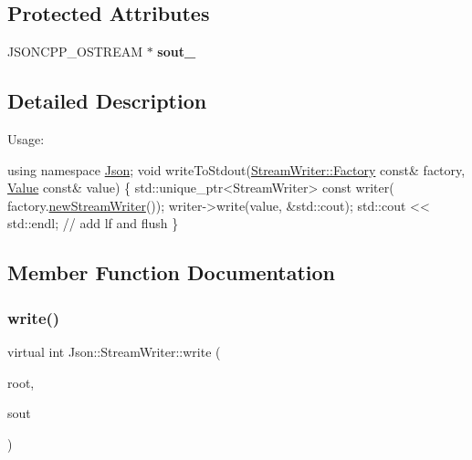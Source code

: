 \subsection*{Protected Attributes}
\begin{DoxyCompactItemize}
\item 
\mbox{\label{classJson_1_1StreamWriter_a4f5603d4228a9fa46a42cb44e5234d9b}} 
J\+S\+O\+N\+C\+P\+P\+\_\+\+O\+S\+T\+R\+E\+AM $\ast$ {\bfseries sout\+\_\+}
\end{DoxyCompactItemize}


\subsection{Detailed Description}
Usage\+: 
\begin{DoxyCode}
\textcolor{keyword}{using namespace }\hyperlink{namespaceJson}{Json};
\textcolor{keywordtype}{void} writeToStdout(\hyperlink{classJson_1_1StreamWriter_1_1Factory}{StreamWriter::Factory} \textcolor{keyword}{const}& factory, 
      \hyperlink{classJson_1_1Value}{Value} \textcolor{keyword}{const}& value) \{
  std::unique\_ptr<StreamWriter> \textcolor{keyword}{const} writer(
    factory.\hyperlink{classJson_1_1StreamWriter_1_1Factory_a9d30ec53e8288cd53befccf1009c5f31}{newStreamWriter}());
  writer->write(value, &std::cout);
  std::cout << std::endl;  \textcolor{comment}{// add lf and flush}
\}
\end{DoxyCode}
 

\subsection{Member Function Documentation}
\mbox{\label{classJson_1_1StreamWriter_a84278bad0c9a9fc587bc2a97c5bb5993}} 
\subsubsection{\texorpdfstring{write()}{write()}}
{\footnotesize\ttfamily virtual int Json\+::\+Stream\+Writer\+::write (\begin{DoxyParamCaption}\item[{\hyperlink{classJson_1_1Value}{Value} const \&}]{root,  }\item[{J\+S\+O\+N\+C\+P\+P\+\_\+\+O\+S\+T\+R\+E\+AM $\ast$}]{sout }\end{DoxyParamCaption})\hspace{0.3cm}{\ttfamily [pure virtual]}}


